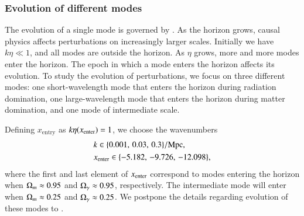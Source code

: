 \subsubsection{Evolution of different modes}\label{sssec:M3:theory:evolution_of_different_modes}
The evolution of a single mode is governed by . As the horizon grows, causal physics affects perturbations on increasingly larger scales. Initially we have $k\eta\ll1$, and all modes are outside the horizon. As $\eta$ grows, more and more modes enter the horizon. The epoch in which a mode enters the horizon affects its evolution. To study the evolution of perturbations, we focus on three different modes: one short-wavelength mode that enters the horizon during radiation domination, one large-wavelength mode that enters the horizon during matter domination, and one mode of intermediate scale. 

Defining $x_\mathrm{entry}$ as $k\eta(x_\mathrm{enter})=1$, we choose the wavenumbers
\begin{equation} \label{eq:M3:theory:k_values_for_plotting}
    \begin{split}
        &k\in\{ 0.001,\,0.03,\,0.3 \}/\mathrm{Mpc}, \\
        &x_\mathrm{enter} \in \{ -5.182,\,-9.726,\,-12.098 \},
    \end{split}
\end{equation}
where the first and last element of $x_\mathrm{enter}$ correspond to modes entering the horizon when $\Omega_{m}\approx0.95$ and $\Omega_{\gamma}\approx0.95$, respectively. The intermediate mode will enter when $\Omega_{m}\approx0.25$ and $\Omega_{\gamma}\approx0.25$. We postpone the details regarding evolution of these modes to . 

